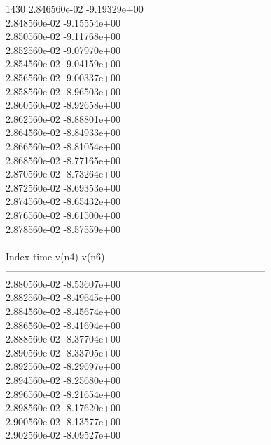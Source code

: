 1430	2.846560e-02	-9.19329e+00	\\ 	2.848560e-02	-9.15554e+00	\\ 	2.850560e-02	-9.11768e+00	\\ 	2.852560e-02	-9.07970e+00	\\ 	2.854560e-02	-9.04159e+00	\\ 	2.856560e-02	-9.00337e+00	\\ 	2.858560e-02	-8.96503e+00	\\ 	2.860560e-02	-8.92658e+00	\\ 	2.862560e-02	-8.88801e+00	\\ 	2.864560e-02	-8.84933e+00	\\ 	2.866560e-02	-8.81054e+00	\\ 	2.868560e-02	-8.77165e+00	\\ 	2.870560e-02	-8.73264e+00	\\ 	2.872560e-02	-8.69353e+00	\\ 	2.874560e-02	-8.65432e+00	\\ 	2.876560e-02	-8.61500e+00	\\ 	2.878560e-02	-8.57559e+00	\\ \hline
\\ \hline
Index   time            v(n4)-v(n6)     \\ \hline
--------------------------------------------------------------------------------\\ 	2.880560e-02	-8.53607e+00	\\ 	2.882560e-02	-8.49645e+00	\\ 	2.884560e-02	-8.45674e+00	\\ 	2.886560e-02	-8.41694e+00	\\ 	2.888560e-02	-8.37704e+00	\\ 	2.890560e-02	-8.33705e+00	\\ 	2.892560e-02	-8.29697e+00	\\ 	2.894560e-02	-8.25680e+00	\\ 	2.896560e-02	-8.21654e+00	\\ 	2.898560e-02	-8.17620e+00	\\ 	2.900560e-02	-8.13577e+00	\\ 	2.902560e-02	-8.09527e+00	\\ \hline
